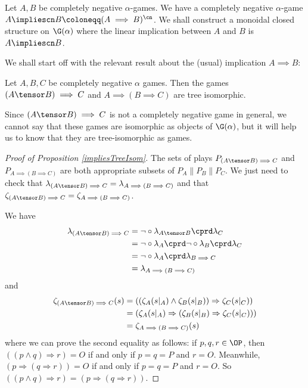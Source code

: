 \documentclass[11pt]{article} %
\begin{document}
Let $A,B$ be completely negative $\alpha$-games.  We have a completely negative $\alpha$-game $A\impliescn B\coloneqq (A\implies B)^{\cn}$.  We shall construct a monoidal closed structure on $\G(\alpha)$ where the linear implication between $A$ and $B$ is $A\impliescn B$.  

We shall start off with the relevant result about the (usual) implication $A\implies B$:

\begin{proposition}
  \label{impliesTreeIsom}
  Let $A,B,C$ be completely negative $\alpha$ games.  Then the games $(A\tensor B)\implies C$ and $A\implies(B\implies C)$ are tree isomorphic.
\end{proposition}

\begin{note}
  Since $(A\tensor B)\implies C$ is not a completely negative game in general, we cannot say that these games are isomorphic as objects of $\G(\alpha)$, but it will help us to know that they are tree-isomorphic as games.
\end{note}

\begin{proof}[Proof of Proposition \ref{impliesTreeIsom}]
  The sets of plays $P_{(A\tensor B)\implies C}$ and $P_{A\implies(B\implies C)}$ are both appropriate subsets of $P_A\|P_B\|P_C$.  We just need to check that $\lambda_{(A\tensor B)\implies C}=\lambda_{A\implies(B\implies C)}$ and that $\zeta_{(A\tensor B)\implies C}=\zeta_{A\implies(B\implies C)}$.  

  We have
  \begin{align*}
    \lambda_{(A\tensor B)\implies C} &= \neg\circ\lambda_{A\tensor B}\cprd\lambda_C\\
    &= \neg\circ\lambda_A\cprd\neg\circ\lambda_B\cprd\lambda_C\\
    &= \neg\circ\lambda_A\cprd\lambda_{B\implies C}\\
    &= \lambda_{A\implies(B\implies C)}
  \end{align*}
  and
  \begin{align*}
    \zeta_{(A\tensor B)\implies C}(s) & = ((\zeta_A(s\vert_A)\wedge\zeta_B(s\vert_B))\Rightarrow\zeta_C(s\vert_C))\\
    &=(\zeta_A(s\vert_A)\Rightarrow(\zeta_B(s\vert_B)\Rightarrow\zeta_C(s\vert_C))) \\
    &=\zeta_{A\implies(B\implies C)}(s)
  \end{align*}
  where we can prove the second equality as follows: if $p,q,r\in\OP$, then $((p\wedge q)\Rightarrow r) = O$ if and only if $p=q=P$ and $r=O$.  Meanwhile, $(p\Rightarrow (q\Rightarrow r))=O$ if and only if $p=q=P$ and $r=O$.  So $((p\wedge q)\Rightarrow r) = (p\Rightarrow(q\Rightarrow r))$.
\end{proof}
\end{document}
